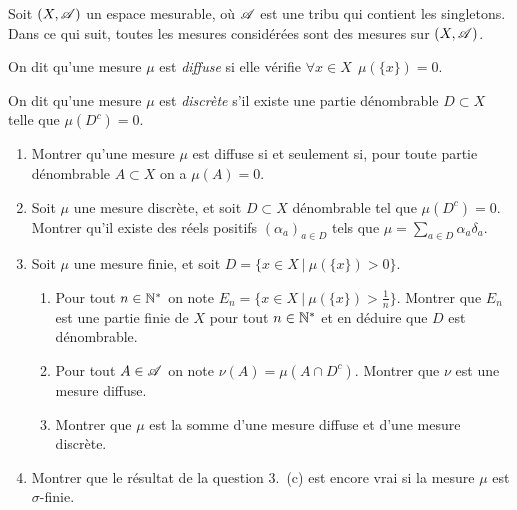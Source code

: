 \begin{td-exo}
    
    Soit \((X,\mathscr{A})\) un espace mesurable, où \(\mathscr{A}\) est une tribu qui contient les singletons. Dans ce qui suit, toutes les mesures considérées sont des mesures sur \((X,\mathscr{A})\).
    
    On dit qu'une mesure \(\mu\) est \emph{diffuse} si elle vérifie \(\forall x\in X\ \ \mu(\{x\})=0\).
    
    On dit qu'une mesure \(\mu\) est \emph{discrète} s'il existe une partie dénombrable \(D\subset X\) telle que \(\mu(D^c)=0\).
    
    \begin{enumerate}
        \item Montrer qu'une mesure \(\mu\) est diffuse si et seulement si, pour toute partie dénombrable \(A\subset X\) on a \(\mu(A)=0\).
        
        \item Soit \(\mu\) une mesure discrète, et soit \(D\subset X\) dénombrable tel que \(\mu(D^c)=0\). Montrer qu'il existe des réels positifs \({(\alpha_a)}_{a\in D}\) tels que \(\displaystyle \mu=\sum_{a\in D}\alpha_a\delta_{a}\).
        
        \item Soit \(\mu\) une mesure finie, et soit \(D=\bigl\{x\in X\ |\ \mu(\{x\})>0\bigr\}\).
        \begin{enumerate}
            \item Pour tout \(n\in\mathbb{N}^*\) on note \(E_n=\bigl\{x\in X\ |\ \mu(\{x\})>\frac{1}{n}\bigr\}\). Montrer que \(E_n\) est une partie finie de \(X\) pour tout \(n\in\mathbb{N}^*\) et en déduire que \(D\) est dénombrable.
            \item Pour tout \(A\in\mathscr{A}\) on note \(\nu(A)=\mu(A\cap D^c)\). Montrer que \(\nu\) est une mesure diffuse.
            \item Montrer que \(\mu\) est la somme d'une mesure diffuse et d'une mesure discrète.
        \end{enumerate}
        
        \item Montrer que le résultat de la question 3.\ (c) est encore vrai si la mesure \(\mu\) est \(\sigma\)-finie.
    \end{enumerate}
\end{td-exo}
    

